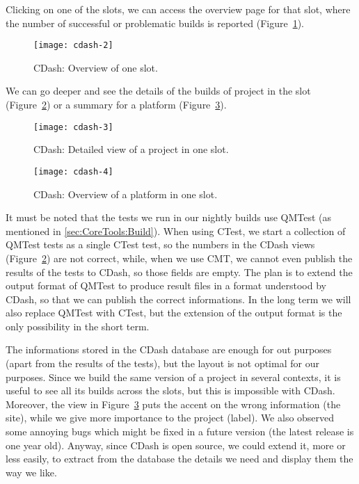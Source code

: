 Clicking on one of the slots, we can access the overview page for that slot,
where the number of successful or problematic builds is reported
(Figure~\ref{fig:cdash-slot}).

\begin{figure}
  \begin{center}
    \texttt{[image: cdash-2]}
  \end{center}
  \caption{CDash: Overview of one slot.}
  \label{fig:cdash-slot}
\end{figure}

We can go deeper and see the details of the builds of project in the slot
(Figure~\ref{fig:cdash-project}) or a summary for a platform
(Figure~\ref{fig:cdash-platform}).

\begin{figure}
  \begin{center}
    \texttt{[image: cdash-3]}
  \end{center}
  \caption{CDash: Detailed view of a project in one slot.}
  \label{fig:cdash-project}
\end{figure}

\begin{figure}
  \begin{center}
    \texttt{[image: cdash-4]}
  \end{center}
  \caption{CDash: Overview of a platform in one slot.}
  \label{fig:cdash-platform}
\end{figure}

It must be noted that the tests we run in our nightly builds use
QMTest\cite{QMTestPaper} (as mentioned in \ref{sec:CoreTools:Build}).  When using
CTest, we start a collection of QMTest tests as a single CTest test, so the
numbers in the CDash views (Figure~\ref{fig:cdash-project}) are not correct,
while, when we use CMT, we cannot even publish the results of the tests to
CDash, so those fields are empty.  The plan is to extend the output format of
QMTest to produce result files in a format understood by CDash, so that we can
publish the correct informations.  In the long term we will also replace QMTest
with CTest, but the extension of the output format is the only possibility in
the short term.

The informations stored in the CDash database are enough for out purposes (apart
from the results of the tests), but the layout is not optimal for our purposes.
Since we build the same version of a project in several contexts, it is useful
to see all its builds across the slots, but this is impossible with CDash.
Moreover, the view in Figure~\ref{fig:cdash-platform} puts the accent on the
wrong information (the site), while we give more importance to the project
(label).  We also observed some annoying bugs which might be fixed in a future
version (the latest release is one year old).  Anyway, since CDash is open
source, we could extend it, more or less easily, to extract from the database
the details we need and display them the way we like.

